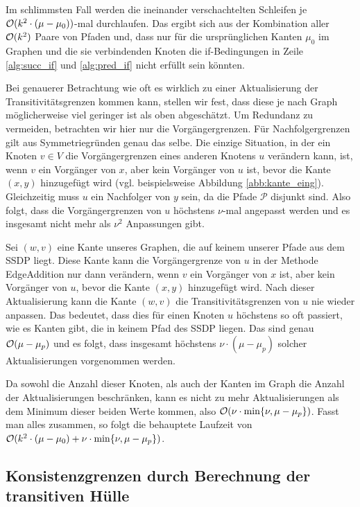 \begin{beweis}
	Im schlimmsten Fall werden die ineinander verschachtelten Schleifen je $\mathcal{O}(k^2 \cdot (\mu - \mu_0))$-mal durchlaufen. Das ergibt sich aus der Kombination aller $\mathcal{O}(k^2)$ Paare von Pfaden und, dass nur für die ursprünglichen Kanten $\mu_0$ im Graphen und die sie verbindenden Knoten die if-Bedingungen in Zeile \ref{alg:succ_if} und \ref{alg:pred_if} nicht erfüllt sein könnten.
	
	Bei genauerer Betrachtung wie oft es wirklich zu einer Aktualisierung der Transitivitätsgrenzen kommen kann, stellen wir fest, dass diese je nach Graph möglicherweise viel geringer ist als oben abgeschätzt. Um Redundanz zu vermeiden, betrachten wir hier nur die Vorgängergrenzen. Für Nachfolgergrenzen gilt aus Symmetriegründen genau das selbe. Die einzige Situation, in der ein Knoten $v \in V$ die Vorgängergrenzen eines anderen Knotens $u$ verändern kann, ist, wenn $v$ ein Vorgänger von $x$, aber kein Vorgänger von $u$ ist, bevor die Kante $(x,y)$ hinzugefügt wird (vgl. beispielsweise Abbildung \ref{abb:kante_eing}). Gleichzeitig muss $u$ ein Nachfolger von $y$ sein, da die Pfade $\mathcal{P}$ disjunkt sind. Also folgt, dass die Vorgängergrenzen von $u$ höchstens $\nu$-mal angepasst werden und es insgesamt nicht mehr als $\nu^2$ Anpassungen gibt. 

	Sei $(w,v)$ eine Kante unseres Graphen, die auf keinem unserer Pfade aus dem SSDP liegt. Diese Kante kann die Vorgängergrenze von $u$ in der Methode \textrm{EdgeAddition} nur dann verändern, wenn $v$ ein Vorgänger von $x$ ist, aber kein Vorgänger von $u$, bevor die Kante $(x,y)$ hinzugefügt wird. Nach dieser Aktualisierung kann die Kante $(w,v)$ die Transitivitätsgrenzen von $u$ nie wieder anpassen. Das bedeutet, dass dies für einen Knoten $u$ höchstens so oft passiert, wie es Kanten gibt, die in keinem Pfad des SSDP liegen. Das sind genau $\mathcal{O}(\mu - \mu_p)$ und es folgt, dass insgesamt höchstens $\nu \cdot (\mu - \mu_p)$ solcher Aktualisierungen vorgenommen werden.
	
	Da sowohl die Anzahl dieser Knoten, als auch der Kanten im Graph die Anzahl der Aktualisierungen beschränken, kann es nicht zu mehr Aktualisierungen als dem Minimum dieser beiden Werte kommen, also $\mathcal{O}(\nu \cdot \min\{\nu, \mu - \mu_p\})$. Fasst man alles zusammen, so folgt die behauptete Laufzeit von $\mathcal{O}(k^2 \cdot (\mu - \mu_0) + \nu \cdot \min\{\nu, \mu - \mu_p\})$.
\end{beweis}

\subsection{Konsistenzgrenzen durch Berechnung der transitiven Hülle}\label{subsec:trans_hull}

